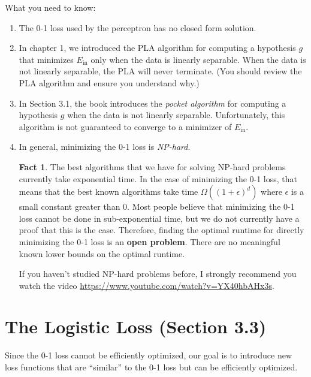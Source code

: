 \documentclass[10pt]{exam}
\theoremstyle{definition}
\newtheorem{example}{Example}
\newtheorem{fact}{Fact}
\newcommand{\Ein}{E_{\text{in}}}
\begin{document}
What you need to know:
\begin{enumerate}
    \item
    The 0-1 loss used by the perceptron has no closed form solution.
    \item
    In chapter 1, we introduced the PLA algorithm for computing a hypothesis $g$ that minimizes $\Ein$ only when the data is linearly separable.
    When the data is not linearly separable, the PLA will never terminate.
    (You should review the PLA algorithm and ensure you understand why.)

    \item
    In Section 3.1, the book introduces the \emph{pocket algorithm} for computing a hypothesis $g$ when the data is not linearly separable.
    Unfortunately, this algorithm is not guaranteed to converge to a minimizer of $\Ein$.

    \item
    In general, minimizing the 0-1 loss is \emph{NP-hard}.

\begin{fact}
    The best algorithms that we have for solving NP-hard problems currently take exponential time.
    In the case of minimizing the 0-1 loss, that means that the best known algorithms take time $\Omega((1+\epsilon)^d)$ where $\epsilon$ is a small constant greater than 0. 
    Most people believe that minimizing the 0-1 loss cannot be done in sub-exponential time,
    but we do not currently have a proof that this is the case.
    Therefore, finding the optimal runtime for directly minimizing the 0-1 loss is an \textbf{open problem}.
    There are no meaningful known lower bounds on the optimal runtime.

    If you haven't studied NP-hard problems before, I strongly recommend you watch the video \url{https://www.youtube.com/watch?v=YX40hbAHx3s}.
\end{fact}

\end{enumerate}

\section*{The Logistic Loss (Section 3.3)}

Since the 0-1 loss cannot be efficiently optimized, our goal is to introduce new loss functions that are ``similar'' to the 0-1 loss but can be efficiently optimized.
\end{document}
